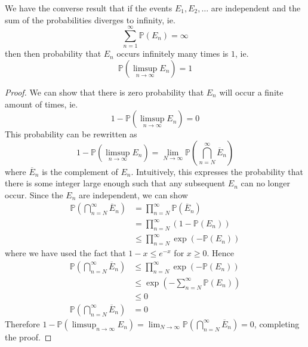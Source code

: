 \documentclass[11pt]{report} %
\begin{document}
We have the converse result that if the events $E_{1}, E_{2}, \dots$ are independent and the sum of the probabilities diverges to infinity, ie.
\begin{equation}
\sum_{n = 1}^{\infty}\mathbb{P}\left(E_{n}\right) = \infty
\end{equation}
then then probability that $E_{n}$ occurs infinitely many times is $1$, ie.
\begin{equation}
\mathbb{P}\left(\limsup_{n \to \infty}E_{n}\right) = 1
\end{equation}
\begin{proof}
We can show that there is zero probability that $E_{n}$ will occur a finite amount of times, ie.
\begin{equation}
1 - \mathbb{P}\left(\limsup_{n \to \infty}E_{n}\right) = 0
\end{equation}
This probability can be rewritten as
\begin{equation}
1 - \mathbb{P}\left(\limsup_{n \to \infty}E_{n}\right) = \lim_{N \to \infty}\mathbb{P}\left(\bigcap_{n = N}^{\infty}\overline{E}_{n}\right)
\end{equation}
where $\overline{E}_{n}$ is the complement of $E_{n}$. Intuitively, this expresses the probability that there is some integer large enough such that any subsequent $E_{n}$ can no longer occur. Since the $E_{n}$ are independent, we can show
\begin{align}
\mathbb{P}\left(\bigcap_{n = N}^{\infty}\overline{E}_{n}\right) &= \prod_{n = N}^{\infty}\mathbb{P}\left(\overline{E}_{n}\right) \\
&= \prod_{n = N}^{\infty}\left(1 - \mathbb{P}\left(E_{n}\right)\right) \\
&\leq \prod_{n = N}^{\infty}\exp\left(-\mathbb{P}\left(E_{n}\right)\right)
\end{align}
where we have used the fact that $1 - x \leq e^{-x}$ for $x \geq 0$. Hence
\begin{align}
\mathbb{P}\left(\bigcap_{n = N}^{\infty}\overline{E}_{n}\right) &\leq \prod_{n = N}^{\infty}\exp\left(-\mathbb{P}\left(E_{n}\right)\right) \\
&\leq \exp\left(-\sum_{n = N}^{\infty}\mathbb{P}\left(E_{n}\right)\right) \\
&\leq 0 \\
\mathbb{P}\left(\bigcap_{n = N}^{\infty}\overline{E}_{n}\right) &= 0
\end{align}
Therefore $1 - \mathbb{P}\left(\limsup_{n \to \infty}E_{n}\right) = \lim_{N \to \infty}\mathbb{P}\left(\bigcap_{n = N}^{\infty}\overline{E}_{n}\right) = 0$, completing the proof.
\end{proof}
\end{document}
